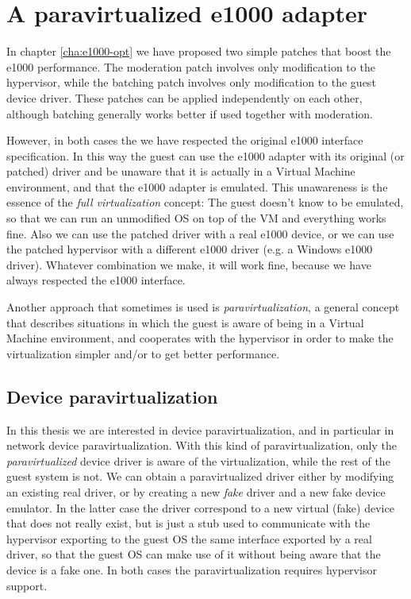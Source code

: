 \chapter{A paravirtualized e1000 adapter}
\label{cha:paravirt}
In chapter \ref{cha:e1000-opt} we have proposed two simple patches that boost the e1000 performance.
The moderation patch involves only modification to the hypervisor, while the batching patch involves only modification to the
guest device driver. These patches can be applied independently on each other, although batching generally works better if
used together with moderation.

\vspace{0.5cm}

However, in both cases the we have respected the original e1000 interface specification. In this way the guest can use the e1000 adapter
with its original (or patched) driver and be unaware that it is actually in a Virtual Machine environment, and that the e1000 adapter is
emulated.  This unawareness is the essence of the \emph{full virtualization} concept: The guest doesn't know to be emulated, so
that we can run an unmodified OS on top of the VM and everything works fine.
Also we can use the patched driver with a real e1000 device, or we can use the patched hypervisor with a different e1000 
driver (e.g. a Windows e1000 driver). Whatever combination we make, it will work fine, because we have always respected the e1000 interface.

\vspace{0.5cm}

Another approach that sometimes is used is \emph{paravirtualization}, a general concept that describes situations in which the 
guest is aware of being in a Virtual Machine environment, and cooperates with the hypervisor in order to make the virtualization simpler
and/or to get better performance.


\section{Device paravirtualization}
In this thesis we are interested in device paravirtualization, and in particular in network device paravirtualization.
With this kind of paravirtualization, only the \emph{paravirtualized} device driver is aware of the virtualization, while the rest of the
guest system is not.
We can obtain a paravirtualized driver either by modifying an existing real driver, or by creating a new \emph{fake} driver and a new
fake device emulator. In the latter case the driver correspond to a new virtual (fake) device that does not really exist, but is
just a stub used to communicate with the hypervisor exporting to the guest OS the same interface exported by a real driver, so that the
guest OS can make use of it without being aware that the device is a fake one. In both cases the paravirtualization requires hypervisor 
support.

